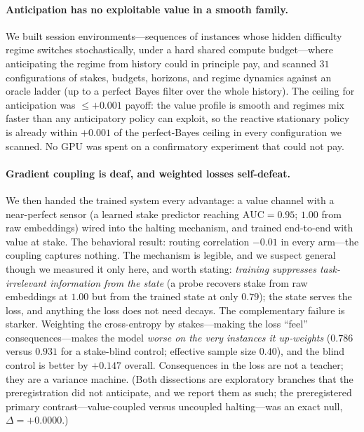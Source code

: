 \documentclass{article}
\newcommand{\NdosESS}{$0.40$} \newcommand{\NdosBlind}{$+0.147$}
\begin{document}
\paragraph{Anticipation has no exploitable value in a smooth family.} We
built session environments---sequences of instances whose hidden difficulty
regime switches stochastically, under a hard shared compute budget---where
anticipating the regime from history could in principle pay, and scanned
$31$ configurations of stakes, budgets, horizons, and regime dynamics
against an oracle ladder (up to a perfect Bayes filter over the whole
history). The ceiling for anticipation was $\le +0.001$ payoff: the value
profile is smooth and regimes mix faster than any anticipatory policy can
exploit, so the reactive stationary policy is already within $+0.001$ of the
perfect-Bayes ceiling in every configuration we scanned. No GPU was
spent on a confirmatory experiment that could not pay.

\paragraph{Gradient coupling is deaf, and weighted losses self-defeat.} We
then handed the trained system every advantage: a value channel with a
near-perfect sensor (a learned stake predictor reaching $\mathrm{AUC}=0.95$;
$1.00$ from raw embeddings) wired into the halting mechanism, and trained
end-to-end with value at stake. The behavioral result: routing correlation
$-0.01$ in every arm---the coupling captures nothing. The mechanism is
legible, and we suspect general though we measured it only here, and worth
stating: \emph{training suppresses task-irrelevant information from the
state} (a probe recovers stake from raw embeddings at $1.00$ but from the
trained state at only $0.79$); the state serves the loss, and anything the
loss does not need decays. The complementary failure is starker. Weighting
the cross-entropy by stakes---making the loss ``feel'' consequences---makes
the model \emph{worse on the very instances it up-weights} ($0.786$ versus
$0.931$ for a stake-blind control; effective sample size \NdosESS), and the
blind control is better by \NdosBlind{} overall. Consequences in the loss are
not a teacher; they are a variance machine. (Both dissections are exploratory branches that the preregistration did
not anticipate, and we report them as such; the preregistered primary
contrast---value-coupled versus uncoupled halting---was an exact null,
$\Delta = +0.0000$.)
\end{document}
